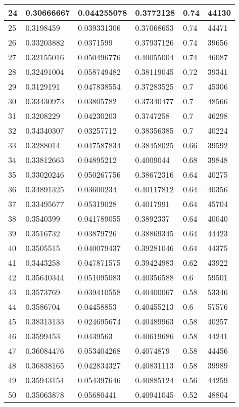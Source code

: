 \begin{longtable}{|l|l|l|l|l|l|}
24 & 0.30666667 & 0.044255078 & 0.3772128 & 0.74 & 44130 \\ \hline 
25 & 0.3198459 & 0.039331306 & 0.37068653 & 0.74 & 44471 \\ \hline 
26 & 0.33203882 & 0.0371599 & 0.37937126 & 0.74 & 39656 \\ \hline 
27 & 0.32155016 & 0.050496776 & 0.40055004 & 0.74 & 46087 \\ \hline 
28 & 0.32491004 & 0.058749482 & 0.38119045 & 0.72 & 39341 \\ \hline 
29 & 0.3129191 & 0.047838554 & 0.37283525 & 0.7 & 45306 \\ \hline 
30 & 0.33430973 & 0.03805782 & 0.37340477 & 0.7 & 48566 \\ \hline 
31 & 0.3208229 & 0.04230203 & 0.3747258 & 0.7 & 46298 \\ \hline 
32 & 0.34340307 & 0.03257712 & 0.38356385 & 0.7 & 40224 \\ \hline 
33 & 0.3288014 & 0.047587834 & 0.38458025 & 0.66 & 39592 \\ \hline 
34 & 0.33812663 & 0.04895212 & 0.4009044 & 0.68 & 39848 \\ \hline 
35 & 0.33020246 & 0.050267756 & 0.38672316 & 0.64 & 40275 \\ \hline 
36 & 0.34891325 & 0.03600234 & 0.40117812 & 0.64 & 40356 \\ \hline 
37 & 0.33495677 & 0.05319028 & 0.4017991 & 0.64 & 45704 \\ \hline 
38 & 0.3540399 & 0.041789055 & 0.3892337 & 0.64 & 40040 \\ \hline 
39 & 0.3516732 & 0.03879726 & 0.38869345 & 0.64 & 44423 \\ \hline 
40 & 0.3505515 & 0.040079437 & 0.39281046 & 0.64 & 44375 \\ \hline 
41 & 0.3443258 & 0.047871575 & 0.39424983 & 0.62 & 43922 \\ \hline 
42 & 0.35640344 & 0.051095083 & 0.40356588 & 0.6 & 59501 \\ \hline 
43 & 0.3573769 & 0.039410558 & 0.40400067 & 0.58 & 53346 \\ \hline 
44 & 0.3586704 & 0.04458853 & 0.40455213 & 0.6 & 57576 \\ \hline 
45 & 0.38313133 & 0.024695674 & 0.40489963 & 0.58 & 40257 \\ \hline 
46 & 0.3599453 & 0.0439563 & 0.40619686 & 0.58 & 44241 \\ \hline 
47 & 0.36084476 & 0.053404268 & 0.4074879 & 0.58 & 44456 \\ \hline 
48 & 0.36838165 & 0.042834327 & 0.40831113 & 0.58 & 39989 \\ \hline 
49 & 0.35943154 & 0.054397646 & 0.40885124 & 0.56 & 44259 \\ \hline 
50 & 0.35063878 & 0.05680441 & 0.40941045 & 0.52 & 48804 \\ \hline 
\end{longtable}